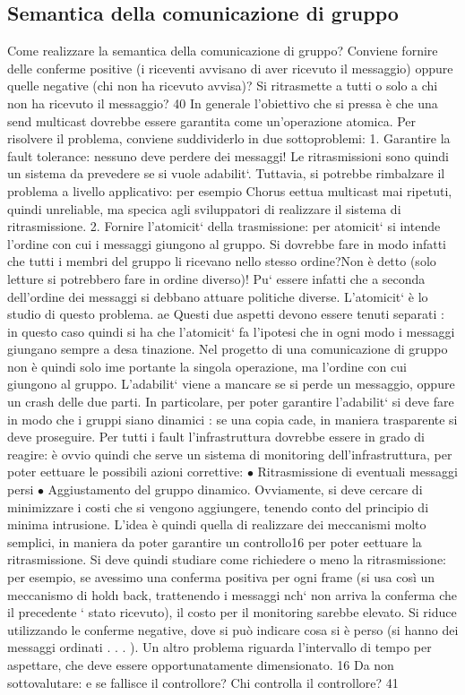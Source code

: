\subsection{Semantica della comunicazione di gruppo}
Come realizzare la semantica della comunicazione di gruppo? Conviene fornire
delle conferme positive (i riceventi avvisano di aver ricevuto il messaggio) oppure
quelle negative (chi non ha ricevuto avvisa)? Si ritrasmette a tutti o solo a chi
non ha ricevuto il messaggio?
40
In generale l'obiettivo che si pressa è che una send multicast dovrebbe
essere garantita come un'operazione atomica. Per risolvere il problema, conviene
suddividerlo in due sottoproblemi:
1. Garantire la fault tolerance: nessuno deve perdere dei messaggi! Le ritrasmissioni sono quindi un sistema da
prevedere se si vuole adabilit`.
Tuttavia, si potrebbe rimbalzare il problema a livello applicativo: per
esempio Chorus eettua multicast mai ripetuti, quindi unreliable, ma
specica agli sviluppatori di realizzare il sistema di ritrasmissione.
2. Fornire l'atomicit` della trasmissione: per atomicit` si intende l'ordine
con cui i messaggi giungono al gruppo. Si dovrebbe fare in modo infatti
che tutti i membri del gruppo li ricevano nello stesso ordine?Non è detto
(solo letture si potrebbero fare in ordine diverso)! Pu` essere infatti che
a seconda dell'ordine dei messaggi si debbano attuare politiche diverse.
L'atomicit` è lo studio di questo problema.
ae
Questi due aspetti devono essere tenuti separati : in questo caso quindi si ha
che l'atomicit` fa l'ipotesi che in ogni modo i messaggi giungano sempre a desa
tinazione. Nel progetto di una comunicazione di gruppo non è quindi solo ime
portante la singola operazione, ma l'ordine con cui giungono al gruppo.
L'adabilit` viene a mancare se si perde un messaggio, oppure un crash
delle due parti. In particolare, per poter garantire l'adabilit` si deve fare in
modo che i gruppi siano dinamici : se una copia cade, in maniera trasparente
si deve proseguire. Per tutti i fault l'infrastruttura dovrebbe essere in grado di
reagire: è ovvio quindi che serve un sistema di monitoring dell'infrastruttura,
per poter eettuare le possibili azioni correttive:
$\bullet$ Ritrasmissione di eventuali messaggi persi
$\bullet$ Aggiustamento del gruppo dinamico.
Ovviamente, si deve cercare di minimizzare i costi che si vengono aggiungere,
tenendo conto del principio di minima intrusione.
L'idea è quindi quella di realizzare dei meccanismi molto semplici, in maniera
da poter garantire un controllo16 per poter eettuare la ritrasmissione. Si deve
quindi studiare come richiedere o meno la ritrasmissione: per esempio, se avessimo una conferma positiva per ogni frame
(si usa così un meccanismo di hold\i{}
back, trattenendo i messaggi nch` non arriva la conferma che il precedente `
stato ricevuto), il costo per il monitoring sarebbe elevato. Si riduce utilizzando
le conferme negative, dove si può indicare cosa si è perso (si hanno dei messaggi
ordinati . . . ). Un altro problema riguarda l'intervallo di tempo per aspettare,
che deve essere opportunatamente dimensionato.
16 Da
non sottovalutare: e se fallisce il controllore? Chi controlla il controllore?
41
